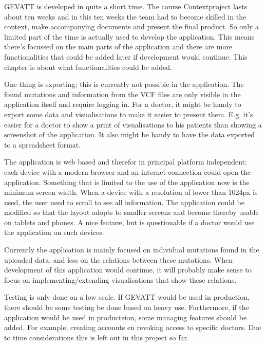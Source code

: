 GEVATT is developed in quite a short time. The course Contextproject lasts about ten weeks and in this ten weeks the team had to become skilled in the context, make accompanying documents	 and present the final product. So only a limited part of the time is actually used to develop the application. This means there's focussed on the main parts of the application and there are more functionalities that could be added later if development would continue. This chapter is about what functionalities  could be added.

One thing is exporting; this is currently not possible in the application. The found mutations and information from the VCF files are only visible in the application itself and require logging in. For a doctor, it might be handy to export some data and visualisations to make it easier to present them. E.g. it's easier for a doctor to show a print of visualisations to his patients than showing a screenshot of the application. It also might be handy to have the data exported to a spreadsheet format.

The application is web based and therefor in principal platform independent: each device with a modern browser and an internet connection could open the application. Something that is limited to the use of the application now is the minimum screen width. When a device with a resolution of lower than 1024px is used, the user need to scroll to see all information. The application could be modified so that the layout adopts to smaller screens and become thereby usable on tablets and phones. A nice feature, but is questionable if a doctor would use the application on such devices.

Currently the application is mainly focused on individual mutations found in the uploaded data, and less on the relations between these mutations. When development of this application would continue, it will probably make sense to focus on implementing/extending visualisations that show these relations.

Testing is only done on a low scale. If GEVATT would be used in production, there should be some testing be done based on heavy use. Furthermore, if the application would be used in producteion, some managing features should be added. For example, creating accounts en revoking access to specific doctors. Due to time considerations this is left out in this project so far.